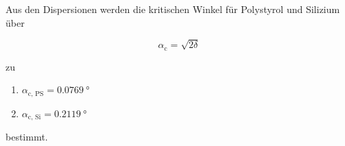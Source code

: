     Aus den Dispersionen werden die kritischen Winkel für Polystyrol und Silizium über

    \begin{equation*}
      \alpha_{\text{c}} = \sqrt{2\delta}
    \end{equation*}

    zu

    \begin{enumerate}
      \item $\alpha_{\text{c, PS}} = \SI{0.0769}{\degree}$
      \item $\alpha_{\text{c, Si}} = \SI{0.2119}{\degree}$
    \end{enumerate}
    
    bestimmt.